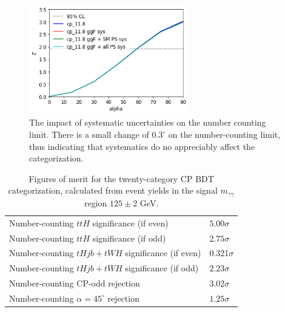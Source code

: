 \begin{figure}
  \centering
        \includegraphics[width=0.62\textwidth]{figures/tthcp_chapter/categorization_xgb/cp_11_syst.png}
  \caption{The impact of systematic uncertainties on the number counting limit. There is a small change of $0.3^\circ$ on the number-counting limit, thus indicating that systematics do no appreciably affect the categorization.}
  \label{fig:ncrej_syst}
\end{figure}


\begin{table}[ht]
\begin{center}
\begin{tabular}{ll}
Number-counting $ttH$ significance (if even)& $5.00\sigma$  \\
Number-counting $ttH$ significance (if odd)& $2.75\sigma$  \\
Number-counting $tHjb + tWH$ significance (if even)& 0.321$\sigma$  \\
Number-counting $tHjb+tWH$ significance (if odd)& $2.23\sigma$  \\ \hline
Number-counting CP-odd rejection & $3.02\sigma$ \\
Number-counting $\alpha=45^\circ$ rejection & $1.25\sigma$ \\ \hline
\hline
\end{tabular}
\end{center}
\vspace{-0.5cm}
\caption{Figures of merit for the twenty-category CP BDT categorization, calculated from event yields in the signal $m_{\gamma\gamma}$ region $125\pm2$ GeV.}
\label{tab:sigs}
\end{table}
